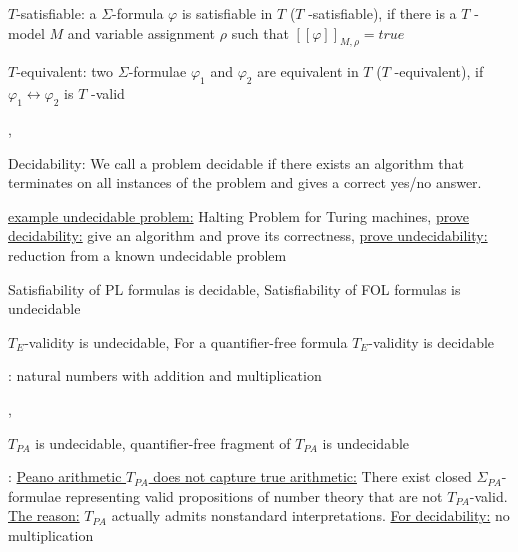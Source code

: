 \documentclass[landscape, a4paper]{article}
\begin{document}
\begin{minipage}[t]{0.2\linewidth}
\begin{betterlist}
		\item \alert{$T$-satisfiable:} a $\Sigma$-formula $\varphi$ is \alert{satisfiable} in $T$ (\alert{$T$ -satisfiable}), if there is a $T$ -model $M$ and variable assignment $\rho$ such that $[[\varphi]]_{M,\rho} = true$
		\item \alert{$T$-equivalent:} two $\Sigma$-formulae $\varphi_1$ and $\varphi_2$ are \alert{equivalent in $T$} (\alert{$T$ -equivalent}), if $\varphi_1 \leftrightarrow \varphi_2$ is $T$ -valid
		\item {}
	\end{betterlist}
\end{minipage}
\begin{minipage}[t]{0.2\linewidth}
	  
	\begin{betterlist}
		\item {}, 
		\item \alert{Decidability}: We call a problem \alert{decidable} if there exists an algorithm that terminates on all instances of the problem and gives a correct yes/no answer.
		\begin{betterlist}
			\item \uline{example undecidable problem:} Halting Problem for Turing machines, \uline{prove decidability:} give an algorithm and prove its correctness, \uline{prove undecidability:} reduction from a known undecidable problem
			\item \alert{Satisfiability} of PL formulas is \alert{decidable}, \alert{Satisfiability} of FOL formulas is \alert{undecidable}
			\item \alert{$T_{E}$-validity} is \alert{undecidable}, For a \alert{quantifier-free formula $T_E$-validity} is \alert{decidable}
			\item {}: natural numbers with addition and multiplication
			\begin{betterlist}
				\item {}, 
				\item \alert{$T_{PA}$} is \alert{undecidable}, \alert{quantifier-free fragment of $T_{PA}$} is \alert{undecidable}
				\item {}: \uline{Peano arithmetic $T_{PA}$ does not capture true arithmetic:} There exist closed $\Sigma_{PA}$-formulae representing valid propositions of number theory that are not $T_{PA}$-valid. \uline{The reason:} $T_{PA}$ actually admits nonstandard interpretations. \underline{For decidability:} \alert{no multiplication}
			\end{betterlist}


\end{betterlist}
\end{betterlist}
\end{minipage}
\end{document}
